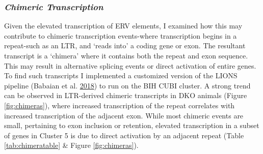 \documentclass[onehalf,12pt]{beavtex}
\begin{document}
  \subsubsection*{\texorpdfstring{\emph{Chimeric
  Transcription}}{Chimeric Transcription}}\label{chimeric-transcription}
  
  Given the elevated transcription of ERV elements, I examined how this
  may contribute to chimeric transcription events-where transcription
  begins in a repeat-such as an LTR, and `reads into' a coding gene or
  exon. The resultant transcript is a `chimera' where it contains both the
  repeat and exon sequence. This may result in alternative splicing events
  or direct activation of entire genes. To find such transcripts I
  implemented a customized version of the LIONS pipeline (Babaian et al.
  \protect\hyperlink{ref-BabaianLIONSAnalysisSuite2018}{2018}) to run on
  the BIH CUBI cluster. A strong trend can be observed in LTR-derived
  chimeric transcripts in DKO animals (Figure \ref{fig:chimeras}), where
  increased transcription of the repeat correlates with increased
  transcription of the adjacent exon. While most chimeric events are
  small, pertaining to exon inclusion or retention, elevated transcription
  in a subset of genes in Cluster 5 is due to direct activation by an
  adjacent repeat (Table \ref{tab:chimeratable} \& Figure
  \ref{fig:chimeras}). \newline
  \newline
  
\end{document}
